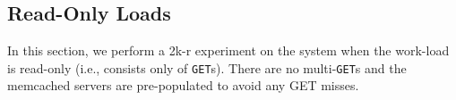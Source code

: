\documentclass[11pt,a4paper]{article}
\begin{document}




 
\subsection{Read-Only Loads}
In this section, we perform a 2k-r experiment on the system when the work-load is read-only (i.e., consists only of \texttt{GET}s). There are no multi-\texttt{GET}s and the memcached servers are pre-populated to avoid any GET  misses.
\end{document}
